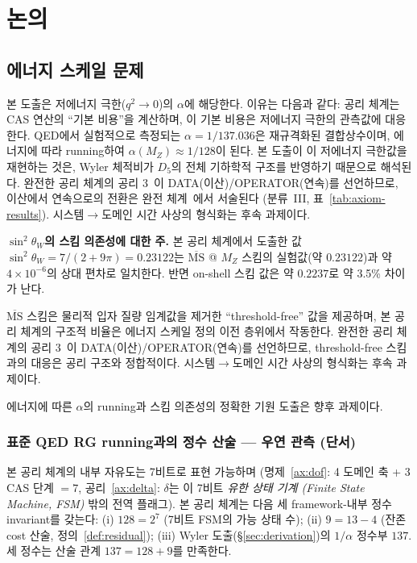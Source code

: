 \documentclass[entropy,article,submit,pdftex,oneauthor]{Definitions/mdpi}
\begin{document}
\section{논의}
\label{sec:discussion}

\subsection{에너지 스케일 문제}

본 도출은 저에너지 극한($q^2 \to 0$)의 $\alpha$에 해당한다. 이유는 다음과 같다: 공리 체계는 CAS 연산의 ``기본 비용''을 계산하며, 이 기본 비용은 저에너지 극한의 관측값에 대응한다. QED에서 실험적으로 측정되는 $\alpha = 1/137.036$은 재규격화된 결합상수이며, 에너지에 따라 running하여 $\alpha(M_Z) \approx 1/128$이 된다. 본 도출이 이 저에너지 극한값을 재현하는 것은, Wyler 체적비가 $D_5$의 전체 기하학적 구조를 반영하기 때문으로 해석된다. 완전한 공리 체계의 공리 3~\cite{han2026}이 DATA(이산)/OPERATOR(연속)를 선언하므로, 이산에서 연속으로의 전환은 완전 체계~\cite{han2026}에서 서술된다 (분류~III, 표~\ref{tab:axiom-results}). 시스템$\to$도메인 시간 사상의 형식화는 후속 과제이다.

\textbf{$\sin^2\theta_W$의 스킴 의존성에 대한 주.} 본 공리 체계에서 도출한 값 $\sin^2\theta_W = 7/(2+9\pi) = 0.23122$는 $\overline{\mathrm{MS}}$ @ $M_Z$ 스킴의 실험값(약 $0.23122$)과 약 $4 \times 10^{-6}$의 상대 편차로 일치한다. 반면 on-shell 스킴 값은 약 $0.2237$로 약 3.5\% 차이가 난다.

$\overline{\mathrm{MS}}$ 스킴은 물리적 입자 질량 임계값을 제거한 ``threshold-free'' 값을 제공하며, 본 공리 체계의 구조적 비율은 에너지 스케일 정의 이전 층위에서 작동한다. 완전한 공리 체계의 공리 3~\cite{han2026}이 DATA(이산)/OPERATOR(연속)를 선언하므로, threshold-free 스킴과의 대응은 공리 구조와 정합적이다. 시스템$\to$도메인 시간 사상의 형식화는 후속 과제이다.

에너지에 따른 $\alpha$의 running과 스킴 의존성의 정확한 기원 도출은 향후 과제이다.

\subsubsection{표준 QED RG running과의 정수 산술 — 우연 관측 (단서)}

본 공리 체계의 내부 자유도는 7비트로 표현 가능하며 (명제~\ref{ax:dof}: 4 도메인 축 + 3 CAS 단계 $= 7$, 공리~\ref{ax:delta}: $\delta$는 이 7비트 \emph{유한 상태 기계 (Finite State Machine, FSM)} 밖의 전역 플래그). 본 공리 체계는 다음 세 framework-내부 정수 invariant를 갖는다: (i) $128 = 2^7$ (7비트 FSM의 가능 상태 수); (ii) $9 = 13 - 4$ (잔존 cost 산술, 정의~\ref{def:residual}); (iii) Wyler 도출(\S\ref{sec:derivation})의 $1/\alpha$ 정수부 $137$. 세 정수는 산술 관계 $137 = 128 + 9$를 만족한다.
\end{document}
